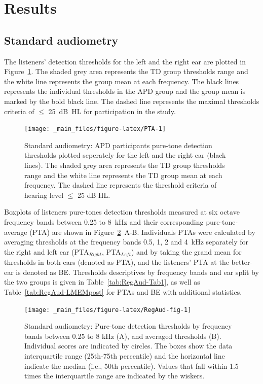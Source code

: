 \documentclass[a4paper, twoside]{templates/ociamthesis}
\begin{document}
\hypertarget{results-3}{%
\section{Results}\label{results-3}}

\hypertarget{standard-audiometry}{%
\subsection{Standard audiometry}\label{standard-audiometry}}

The listeners' detection thresholds for the left and the right ear are plotted in Figure~\ref{fig:PTA}. The shaded grey area represents the TD group thresholds range and the white line represents the group mean at each frequency. The black lines represents the individual thresholds in the APD group and the group mean is marked by the bold black line. The dashed line represents the maximal thresholds criteria of \(\leq\) 25~dB~HL for participation in the study.~

\begin{figure}

{\centering \texttt{[image: \_main\_files/figure-latex/PTA-1]} 

}

\caption{Standard audiometry: APD participants pure-tone detection thresholds plotted seperately for the left and the right ear (black lines). The shaded grey area represents the TD group thresholds range and the white line represents the TD group mean at each frequency. The dashed line represents the threshold criteria of hearing level $\leq$ 25 dB HL.}\label{fig:PTA}
\end{figure}

Boxplots of listeners pure-tones detection thresholds measured at six octave frequency bands between 0.25 to 8~kHz and their corresponding pure-tone-average (PTA) are shown in Figure~\ref{fig:RegAud-fig}~A-B. Individuals PTAs were calculated by averaging thresholds at the frequency bands 0.5, 1, 2 and 4~kHz separately for the right and left ear (PTA\(_{Right}\), PTA\(_{Left}\)) and by taking the grand mean for thresholds in both ears (denoted as PTA), and the listeners' PTA at the better-ear is denoted as BE. Thresholds descriptives by frequency bands and ear split by the two groups is given in Table~\ref{tab:RegAud-Tab1}, as well as Table~\ref{tab:RegAud-LMEMpost} for PTAs and BE with additional statistics.\\

\begin{figure}

{\centering \texttt{[image: \_main\_files/figure-latex/RegAud-fig-1]} 

}

\caption{Standard audiometry: Pure-tone detection thresholds by frequency bands between 0.25 to 8 kHz (A), and averaged thresholds (B). Individual scores are indicated by circles. The boxes show the data interquartile range (25th-75th percentile) and the horizontal line indicate the median (i.e., 50th percentile). Values that fall within 1.5 times the interquartile range are indicated by the wiskers.}\label{fig:RegAud-fig}
\end{figure}
\end{document}
